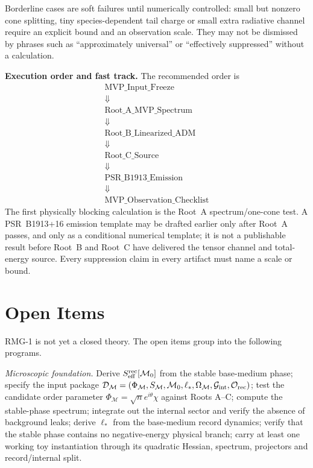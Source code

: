 \documentclass[11pt]{article}
\begin{document}
Borderline cases are soft failures until numerically controlled: small but
nonzero cone splitting, tiny species-dependent tail charge or small extra
radiative channel require an explicit bound and an observation scale.  They
may not be dismissed by phrases such as ``approximately universal'' or
``effectively suppressed'' without a calculation.

\medskip\noindent\textbf{Execution order and fast track.}
The recommended order is
\[
\boxed{
\begin{gathered}
\text{MVP\_Input\_Freeze}\\
\Downarrow\\
\text{Root\_A\_MVP\_Spectrum}\\
\Downarrow\\
\text{Root\_B\_Linearized\_ADM}\\
\Downarrow\\
\text{Root\_C\_Source}\\
\Downarrow\\
\text{PSR\_B1913\_Emission}\\
\Downarrow\\
\text{MVP\_Observation\_Checklist}
\end{gathered}
}
\]
The first physically blocking calculation is the Root~A spectrum/one-cone
test.  A PSR~B1913+16 emission template may be drafted earlier only after
Root~A passes, and only as a conditional numerical template; it is not a
publishable result before Root~B and Root~C have delivered the tensor channel
and total-energy source.  Every suppression claim in every artifact must name
a scale or bound.

\section{Open Items}

RMG-1 is not yet a closed theory.  The open items group into the following
programs.

\medskip\noindent\textit{Microscopic foundation.}
Derive $S_{\rm eff}^{\rm rec}[\mathcal M_0]$ from the stable base-medium phase;
specify the input package
$\mathcal D_{\mathcal M}=(\Phi_{\mathcal M},S_{\mathcal M},\mathcal M_0,\ell_*,
\Omega_{\mathcal M},\mathcal G_{\rm int},\mathcal O_{\rm rec})$; test the
candidate order parameter $\Phi_{\mathcal M}=\sqrt n e^{i\theta}\chi$ against
Roots A--C; compute the stable-phase spectrum; integrate out the internal
sector and verify the absence of background leaks; derive
$\ell_*$ from the base-medium record dynamics; verify that the stable phase
contains no negative-energy physical branch; carry at least one working toy
instantiation through its quadratic Hessian, spectrum, projectors and
record/internal split.
\end{document}
